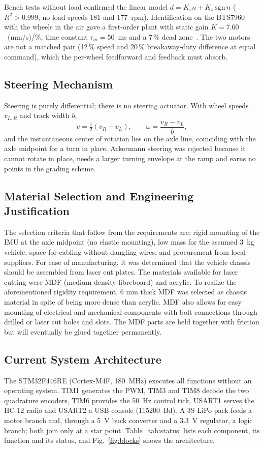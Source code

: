 \documentclass[conference]{IEEEtran}\newcommand{\haveieee}{}%
\begin{document}
Bench tests without load confirmed the linear model $d=K_v n+K_s\,\mathrm{sgn}\,n$ ($R^2>0.999$, no-load speeds 181 and 177~rpm). Identification on the BTS7960 with the wheels in the air gave a first-order plant with static gain $K=7.60$~(mm/s)/\%, time constant $\tau_m=50$~ms and a 7\,\% dead zone~\cite{techref}. The two motors are not a matched pair (12\,\% speed and 20\,\% breakaway-duty difference at equal command), which the per-wheel feedforward and feedback must absorb.

\subsection{Steering Mechanism}
Steering is purely differential; there is no steering actuator. With wheel speeds $v_{L,R}$ and track width $b$,
\begin{equation}
v=\tfrac12(v_R+v_L),\qquad \omega=\frac{v_R-v_L}{b},
\label{eq:kin}
\end{equation}
and the instantaneous center of rotation lies on the axle line, coinciding with the axle midpoint for a turn in place. Ackermann steering was rejected because it cannot rotate in place, needs a larger turning envelope at the ramp and earns no points in the grading scheme.

\subsection{Material Selection and Engineering Justification}
The selection criteria that follow from the requirements are: rigid mounting of the IMU at the axle midpoint (no elastic mounting), low mass for the assumed 3~kg vehicle, space for cabling without dangling wires, and procurement from local suppliers. For ease of manufacturing, it was determined that the vehicle chassis should be assembled from laser cut plates. The materials available for laser cutting were MDF (medium density fibreboard) and acrylic. To realize the aforementioned rigidity requirement, $6$ mm thick MDF was selected as chassis material in spite of being more dense than acrylic. MDF also allows for easy mounting of electrical and mechanical components with bolt connections through drilled or laser cut holes and slots. The MDF parts are held together with friction but will eventually be glued together permanently.

\subsection{Current System Architecture}
The STM32F446RE (Cortex-M4F, 180~MHz) executes all functions without an operating system. TIM1 generates the PWM, TIM3 and TIM8 decode the two quadrature encoders, TIM6 provides the 50~Hz control tick, USART1 serves the HC-12 radio and USART2 a USB console (115200~Bd). A 3S LiPo pack feeds a motor branch and, through a 5~V buck converter and a 3.3~V regulator, a logic branch; both join only at a star point. Table~\ref{tab:status} lists each component, its function and its status, and Fig.~\ref{fig:blocks} shows the architecture.
\end{document}
